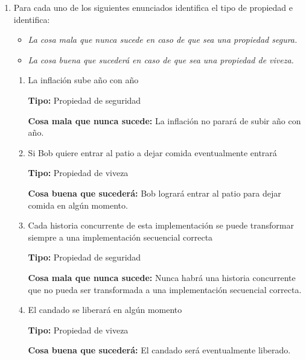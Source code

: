 \begin{enumerate}
    \item Para cada uno de los siguientes enunciados identifica el tipo de propiedad e identifica:

    \begin{itemize}
        \item \textit{La cosa mala que nunca sucede en caso de que sea una propiedad segura.}

        \item \textit{La cosa buena que sucederá en caso de que sea una propiedad de viveza.}
    \end{itemize}

    \begin{enumerate}
        \item La inflación sube año con año

        \textbf{Tipo:} Propiedad de seguridad
        
        \textbf{Cosa mala que nunca sucede:} La inflación no parará de subir año con año.

        \hfill
        
        \item Si Bob quiere entrar al patio a dejar comida eventualmente entrará

        \textbf{Tipo:} Propiedad de viveza
    
        \textbf{Cosa buena que sucederá:} Bob logrará entrar al patio para dejar comida en algún momento.

        \hfill
        
        \item Cada historia concurrente de esta implementación se puede transformar siempre a una implementación secuencial correcta

         \textbf{Tipo:} Propiedad de seguridad
         
         \textbf{Cosa mala que nunca sucede:} Nunca habrá una historia concurrente que no pueda ser transformada a una implementación secuencial correcta.

         \hfill
        
        \item El candado se liberará en algún momento

        \textbf{Tipo:} Propiedad de viveza
        
        \textbf{Cosa buena que sucederá:} El candado será eventualmente liberado.

        \hfill


\end{enumerate}
\end{enumerate}
